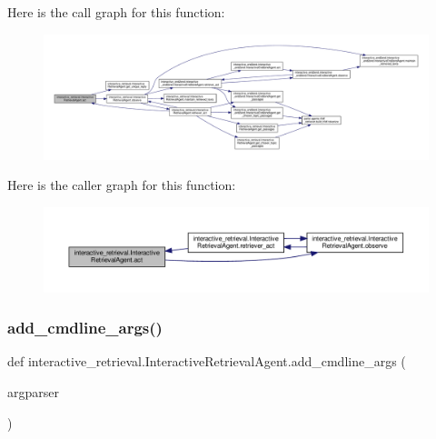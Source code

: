 Here is the call graph for this function\+:
\nopagebreak
\begin{figure}[H]
\begin{center}
\leavevmode
\includegraphics[width=350pt]{classinteractive__retrieval_1_1InteractiveRetrievalAgent_ad350c65cd9fc9393902f61cd77f1cc52_cgraph}
\end{center}
\end{figure}
Here is the caller graph for this function\+:
\nopagebreak
\begin{figure}[H]
\begin{center}
\leavevmode
\includegraphics[width=350pt]{classinteractive__retrieval_1_1InteractiveRetrievalAgent_ad350c65cd9fc9393902f61cd77f1cc52_icgraph}
\end{center}
\end{figure}
\mbox{\label{classinteractive__retrieval_1_1InteractiveRetrievalAgent_aee00317227b637f9ef4240369575f7ac}} 
\subsubsection{\texorpdfstring{add\+\_\+cmdline\+\_\+args()}{add\_cmdline\_args()}}
{\footnotesize\ttfamily def interactive\+\_\+retrieval.\+Interactive\+Retrieval\+Agent.\+add\+\_\+cmdline\+\_\+args (\begin{DoxyParamCaption}\item[{}]{argparser }\end{DoxyParamCaption})\hspace{0.3cm}{\ttfamily [static]}}

